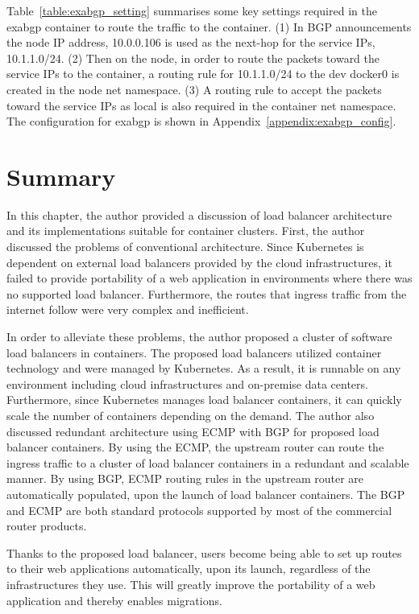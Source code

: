 Table~\ref{table:exabgp_setting} summarises some key settings required in the exabgp container to route the traffic to the  container.
(1) In BGP announcements the node IP address, 10.0.0.106 is used as the next-hop for the service IPs, 10.1.1.0/24.
(2) Then on the node, in order to route the packets toward the service IPs to the  container, 
a routing rule for 10.1.1.0/24 to the dev docker0 is created in the node net namespace. 
(3) A routing rule to accept the packets toward the service IPs as local is also required in the container net namespace. 
The configuration for exabgp is shown in Appendix~\ref{appendix:exabgp_config}.

\FloatBarrier


\section{Summary}

In this chapter, the author provided a discussion of load balancer architecture and its implementations suitable for container clusters.
%
First, the author discussed the problems of conventional architecture.
Since Kubernetes is dependent on external load balancers provided by the cloud infrastructures,
it failed to provide portability of a web application in environments where there was no supported load balancer.
Furthermore, the routes that ingress traffic from the internet follow were very complex and inefficient.

In order to alleviate these problems, the author proposed a cluster of software load balancers in containers.
The proposed load balancers utilized container technology and were managed by Kubernetes.
As a result, it is runnable on any environment including cloud infrastructures and on-premise data centers.
Furthermore, since Kubernetes manages load balancer containers, it can quickly scale the number of containers depending on the demand.
%
The author also discussed redundant architecture using ECMP with BGP for proposed load balancer containers.
By using the ECMP, the upstream router can route the ingress traffic to a cluster of load balancer containers in a redundant and scalable manner.
By using BGP, ECMP routing rules in the upstream router are automatically populated, upon the launch of load balancer containers.
The BGP and ECMP are both standard protocols supported by most of the commercial router products.

Thanks to the proposed load balancer, users become being able to set up routes to their web applications automatically, upon its launch, regardless of the infrastructures they use.  
This will greatly improve the portability of a web application and thereby enables migrations.




